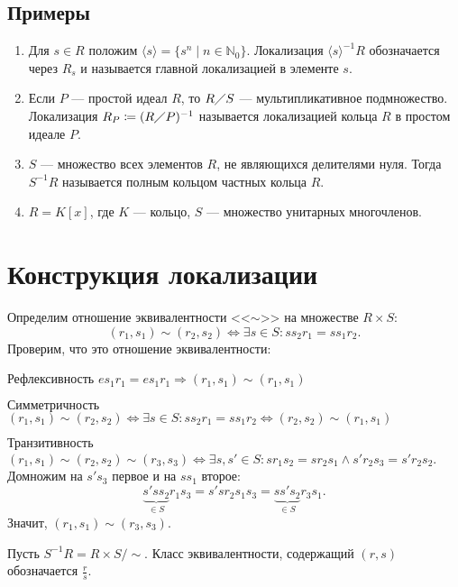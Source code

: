 \documentclass[11pt]{book}
\newcommand{\N}{\mathbb{N}}
\newcommand{\po}{\diagup}
\theoremstyle{definition}
\theoremstyle{plain}
\theoremstyle{plain}
\theoremstyle{definition}
\theoremstyle{remark}
\begin{document}
\subsection{Примеры}
\begin{enumerate}
    \item Для $ s \in R$ положим $ \langle s \rangle = \{s^{n} \mid n \in \N_0\}$. Локализация $ \langle s \rangle^{-1} R $ обозначается через $ R_s$ и называется {\sf главной локализацией в элементе $ s$}.
    \item Если $ P$ --- простой идеал  $ R$, то  $ R \po S$ --- мультипликативное подмножество.
	Локализация  $ R_{P} \coloneqq (R \po P)^{-1}$ называется {\sf локализацией кольца $ R$ в простом идеале  $ P$}.
    \item  $ S$ --- множество всех элементов   $ R$, не являющихся делителями нуля. Тогда  $ S^{-1}R$ называется {\sf полным кольцом частных кольца $ R$}.
    \item  $ R = K[x]$, где  $ K$ --- кольцо,  $ S$ --- множество унитарных многочленов.
\end{enumerate}
\section{Конструкция локализации}
Определим отношение эквивалентности <<$ \sim $>> на множестве $ R \times S$:
\[
    (r_1, s_1) \sim (r_2, s_2) \Longleftrightarrow \exists s \in  S: ss_2r_1 = ss_1r_2
.\]
Проверим, что это отношение эквивалентности:
\begin{description}
    \item $ \boxed{\text{Рефлексивность}}$ $ e s_1r_1 = e s_1r_1 \Longrightarrow (r_1, s_1) \sim (r_1, s_1)$
    \item $ \boxed{\text{Симметричность}}$ $ (r_1, s_1) \sim (r_2, s_2) \Longleftrightarrow \exists s \in S: ss_2r_1 = ss_1r_2 \Longleftrightarrow (r_2, s_2) \sim (r_1, s_1)$
    \item $ \boxed{\text{Транзитивность}}$  $ (r_1, s_1) \sim (r_2 , s_2) \sim (r_3, s_3) \Longleftrightarrow \exists s, s' \in S: s r_1 s_2 = s r_2 s_1 \wedge s'r_2 s_3 = s' r_2s_2$. Домножим на $ s's_3$ первое и на $ ss_1$ второе:
	\[
	    \underbrace{s'ss_2}_{\in S}r_1s_3 = s's r_2 s_1 s_3 = \underbrace{s s' s_2}_{ \in S} r_3 s_1
	.\]
	Значит, $ (r_1, s_1) \sim (r_3, s_3)$.
\end{description}
Пусть $ S^{-1}R = R \times S / \sim $.  Класс эквивалентности, содержащий $ (r, s)$ обозначается  $ \frac{r}{s}$.
\end{document}
